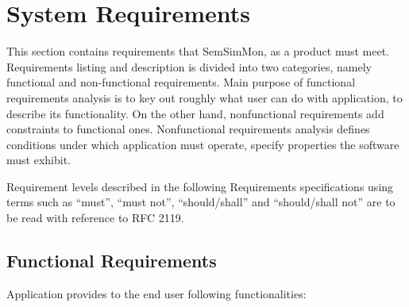 %
\section{System Requirements}
\label{sec:SystemRequirements}

This section contains requirements that SemSimMon, as a product must meet. Requirements listing and description is divided into two categories, namely functional and non-functional requirements. Main purpose of functional requirements analysis is to key out roughly what user can do with application, to describe its functionality. On the other hand, nonfunctional requirements add constraints to functional ones. Nonfunctional requirements analysis defines conditions under which application must operate, specify properties the software must exhibit\cite{Windle:SoftReq}.

Requirement levels described in the following Requirements specifications using terms such as ``must'', ``must not'', ``should/shall'' and ``should/shall not'' are to be read with reference to RFC 2119\cite{rfc:2119}.

\subsection{Functional Requirements}
\label{subsec:FunctionalRequirements}

Application provides to the end user following functionalities: 

